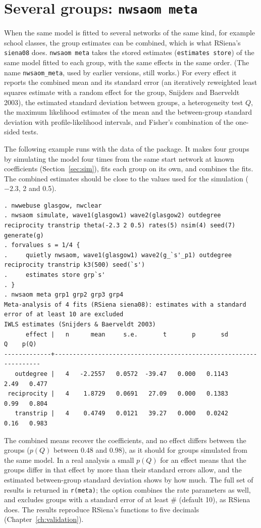 \section{Several groups: \texttt{nwsaom meta}}\label{sec:meta}

When the same model is fitted to several networks of the same kind, for example school classes, the group estimates can be combined, which is what RSiena's \texttt{siena08} does. \texttt{nwsaom meta} takes the stored estimates (\texttt{estimates store}) of the same model fitted to each group, with the same effects in the same order. (The name \texttt{nwsaom\_meta}, used by earlier versions, still works.) For every effect it reports the combined mean and its standard error (an iteratively reweighted least squares estimate with a random effect for the group, Snijders and Baerveldt 2003), the estimated standard deviation between groups, a heterogeneity test $Q$, the maximum likelihood estimates of the mean and the between-group standard deviation with profile-likelihood intervals, and Fisher's combination of the one-sided tests.

The following example runs with the data of the package. It makes four groups by simulating the model four times from the same start network at known coefficients (Section~\ref{sec:sim}), fits each group on its own, and combines the fits. The combined estimates should be close to the values used for the simulation ($-2.3$, 2 and 0.5).
\begin{lstlisting}
. nwwebuse glasgow, nwclear
. nwsaom simulate, wave1(glasgow1) wave2(glasgow2) outdegree reciprocity transtrip theta(-2.3 2 0.5) rates(5) nsim(4) seed(7) generate(g)
. forvalues s = 1/4 {
.     quietly nwsaom, wave1(glasgow1) wave2(g_`s'_p1) outdegree reciprocity transtrip k3(500) seed(`s')
.     estimates store grp`s'
. }
. nwsaom meta grp1 grp2 grp3 grp4
Meta-analysis of 4 fits (RSiena siena08): estimates with a standard error of at least 10 are excluded
IWLS estimates (Snijders & Baerveldt 2003)
      effect |   n      mean     s.e.       t       p       sd        Q    p(Q)
-------------+------------------------------------------------------------------
   outdegree |   4   -2.2557   0.0572  -39.47   0.000   0.1143     2.49   0.477
 reciprocity |   4    1.8729   0.0691   27.09   0.000   0.1383     0.99   0.804
   transtrip |   4    0.4749   0.0121   39.27   0.000   0.0242     0.16   0.983
\end{lstlisting}
The combined means recover the coefficients, and no effect differs between the groups ($p(Q)$ between 0.48 and 0.98), as it should for groups simulated from the same model. In a real analysis a small $p(Q)$ for an effect means that the groups differ in that effect by more than their standard errors allow, and the estimated between-group standard deviation shows by how much. The full set of results is returned in \texttt{r(meta)}; the option  combines the rate parameters as well, and  excludes groups with a standard error of at least \# (default 10), as RSiena does. The results reproduce RSiena's functions to five decimals (Chapter~\ref{ch:validation}).

